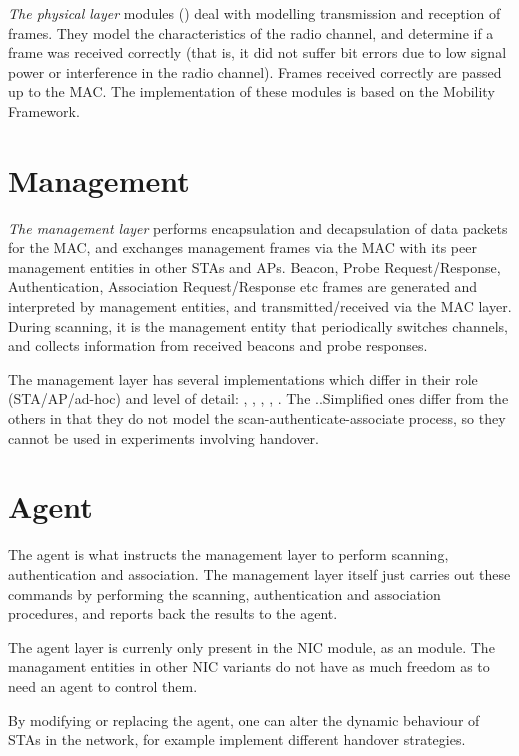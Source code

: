 \textit{The physical layer} modules () deal with modelling
transmission and reception of frames. They model the characteristics of
the radio channel, and determine if a frame was received correctly
(that is, it did not suffer bit errors due to low signal power or
interference in the radio channel). Frames received correctly are passed
up to the MAC. The implementation of these modules is based on the
Mobility Framework.

\section{Management}
\label{sec:80211:management}

\textit{The management layer} performs encapsulation and decapsulation of data packets
for the MAC, and exchanges management frames via the MAC with its peer
management entities in other STAs and APs. Beacon, Probe Request/Response,
Authentication, Association Request/Response etc frames are generated
and interpreted by management entities, and transmitted/received via
the MAC layer. During scanning, it is the management entity that periodically
switches channels, and collects information from received beacons and
probe responses.

The management layer has several implementations which differ in their role
(STA/AP/ad-hoc) and level of detail: ,
, , ,
. The ..Simplified ones differ from the others
in that they do not model the scan-authenticate-associate process,
so they cannot be used in experiments involving handover.

\section{Agent}
\label{sec:80211:agent}

The agent is what instructs the management layer to perform
scanning, authentication and association. The management layer itself
just carries out these commands by performing the scanning, authentication
and association procedures, and reports back the results to the agent.

The agent layer is currenly only present in the  NIC module,
as an  module. The managament entities in other NIC
variants do not have as much freedom as to need an agent to control them.

By modifying or replacing the agent, one can alter the dynamic behaviour
of STAs in the network, for example implement different handover strategies.




